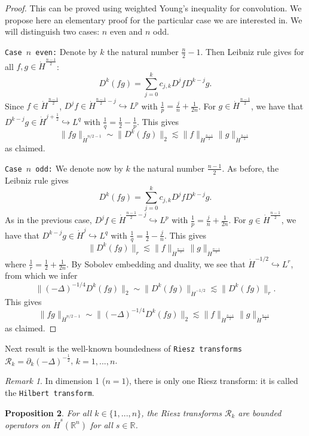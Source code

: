\documentclass[a4paper, 12pt]{article}
\theoremstyle{plain}
\newtheorem{proposition}{Proposition}[section]
\theoremstyle{definition}
\theoremstyle{remark}
\newtheorem{remark}[proposition]{Remark}
\numberwithin{equation}{section}
\begin{document}
\begin{proof}
This can be proved using weighted Young's inequality for convolution.
We propose here an elementary proof for the particular case we are interested in. We will distinguish two cases: $n$ even and $n$ odd.

\noindent
{\tt Case $n$ even:}
Denote by $k$ the natural number $\frac{n}{2}-1$. Then Leibniz rule gives for all $f,g\in \dot H^{\frac{n-1}{2}}$:
\[
D^k(fg)=\sum_{j=0}^k c_{j,k} D^jfD^{k-j}g.
\]
Since $f\in \dot H^{\frac{n-1}{2}}$, $D^jf\in \dot H^{\frac{n-1}{2}-j}\hookrightarrow L^p$ with $\frac{1}{p}=\frac{j}{n}+\frac{1}{2n}$.
For $g\in \dot H^{\frac{n-1}{2}}$, we have that $D^{k-j}g\in \dot H^{j+\frac{1}{2}}\hookrightarrow L^q$ with $\frac{1}{q}=\frac{1}{2}-\frac{1}{p}$.
This gives
\[
\|fg\|_{\dot H^{n/2-1}} \sim \|D^k(fg)\|_2\lesssim \|f\|_{\dot H^{\frac{n-1}{2}}} \|g\|_{\dot H^{\frac{n-1}{2}}}
\]
as claimed.

\noindent
{\tt Case $n$ odd:}
We denote now by $k$ the natural number $\frac{n-1}{2}$. As before, the Leibniz rule gives
\[
D^k(fg)=\sum_{j=0}^kc_{j,k} D^jfD^{k-j}g.
\]
As in the previous case, $D^jf\in \dot H^{\frac{n-1}{2}-j}\hookrightarrow L^p$ with $\frac{1}{p}=\frac{j}{n}+\frac{1}{2n}$.
For $g\in \dot H^{\frac{n-1}{2}}$, we have that $D^{k-j}g\in \dot H^j \hookrightarrow L^q$ with $\frac{1}{q}=\frac{1}{2}-\frac{j}{n}$.
This gives
\[
\|D^k(fg)\|_r\lesssim \|f\|_{\dot H^{\frac{n-1}{2}}} \|g\|_{\dot H^{\frac{n-1}{2}}}
\]
where $\frac{1}{r}=\frac{1}{2}+\frac{1}{2n}$. By Sobolev embedding and duality, we see that $\dot H^{-1/2}\hookrightarrow L^r$, 
from which we infer
\[
\|(-\Delta)^{-1/4}D^k(fg)\|_2\sim \|D^k(fg)\|_{\dot H^{-1/2}}\lesssim \|D^k(fg)\|_r.
\]
This gives
\[
\|fg\|_{\dot H^{n/2-1}}\sim \|(-\Delta)^{-1/4}D^k(fg)\|_2 \lesssim  \|f\|_{\dot H^{\frac{n-1}{2}}} \|g\|_{\dot H^{\frac{n-1}{2}}}
\]
as claimed.
\end{proof}

Next result is the well-known boundedness of {\tt Riesz transforms} ${\mathcal{R}}_k=\partial_k(-\Delta)^{-\frac{1}{2}}$, $k=1,...,n$.

\begin{remark}
In dimension 1 ($n=1$), there is only one Riesz transform: it is called the {\tt Hilbert transform}.
\end{remark}

\begin{proposition}
For all $k\in \{1,...,n\}$, the Riesz transforms ${\mathcal{R}}_k$ are bounded operators on $\dot H^s({\mathds{R}}^n)$ for all $s\in{\mathds{R}}$.
\end{proposition}
\end{document}
